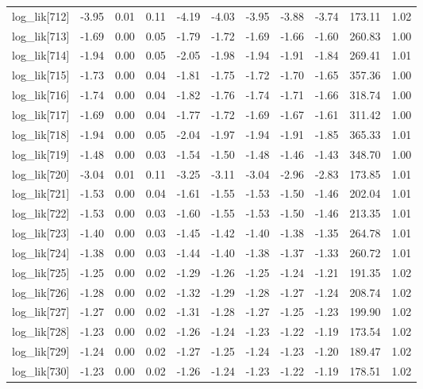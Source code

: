 \begin{table}[ht]
\begin{tabular}{rrrrrrrrrrr}
  log\_lik[712] & -3.95 & 0.01 & 0.11 & -4.19 & -4.03 & -3.95 & -3.88 & -3.74 & 173.11 & 1.02 \\ 
  log\_lik[713] & -1.69 & 0.00 & 0.05 & -1.79 & -1.72 & -1.69 & -1.66 & -1.60 & 260.83 & 1.00 \\ 
  log\_lik[714] & -1.94 & 0.00 & 0.05 & -2.05 & -1.98 & -1.94 & -1.91 & -1.84 & 269.41 & 1.01 \\ 
  log\_lik[715] & -1.73 & 0.00 & 0.04 & -1.81 & -1.75 & -1.72 & -1.70 & -1.65 & 357.36 & 1.00 \\ 
  log\_lik[716] & -1.74 & 0.00 & 0.04 & -1.82 & -1.76 & -1.74 & -1.71 & -1.66 & 318.74 & 1.00 \\ 
  log\_lik[717] & -1.69 & 0.00 & 0.04 & -1.77 & -1.72 & -1.69 & -1.67 & -1.61 & 311.42 & 1.00 \\ 
  log\_lik[718] & -1.94 & 0.00 & 0.05 & -2.04 & -1.97 & -1.94 & -1.91 & -1.85 & 365.33 & 1.01 \\ 
  log\_lik[719] & -1.48 & 0.00 & 0.03 & -1.54 & -1.50 & -1.48 & -1.46 & -1.43 & 348.70 & 1.00 \\ 
  log\_lik[720] & -3.04 & 0.01 & 0.11 & -3.25 & -3.11 & -3.04 & -2.96 & -2.83 & 173.85 & 1.01 \\ 
  log\_lik[721] & -1.53 & 0.00 & 0.04 & -1.61 & -1.55 & -1.53 & -1.50 & -1.46 & 202.04 & 1.01 \\ 
  log\_lik[722] & -1.53 & 0.00 & 0.03 & -1.60 & -1.55 & -1.53 & -1.50 & -1.46 & 213.35 & 1.01 \\ 
  log\_lik[723] & -1.40 & 0.00 & 0.03 & -1.45 & -1.42 & -1.40 & -1.38 & -1.35 & 264.78 & 1.01 \\ 
  log\_lik[724] & -1.38 & 0.00 & 0.03 & -1.44 & -1.40 & -1.38 & -1.37 & -1.33 & 260.72 & 1.01 \\ 
  log\_lik[725] & -1.25 & 0.00 & 0.02 & -1.29 & -1.26 & -1.25 & -1.24 & -1.21 & 191.35 & 1.02 \\ 
  log\_lik[726] & -1.28 & 0.00 & 0.02 & -1.32 & -1.29 & -1.28 & -1.27 & -1.24 & 208.74 & 1.02 \\ 
  log\_lik[727] & -1.27 & 0.00 & 0.02 & -1.31 & -1.28 & -1.27 & -1.25 & -1.23 & 199.90 & 1.02 \\ 
  log\_lik[728] & -1.23 & 0.00 & 0.02 & -1.26 & -1.24 & -1.23 & -1.22 & -1.19 & 173.54 & 1.02 \\ 
  log\_lik[729] & -1.24 & 0.00 & 0.02 & -1.27 & -1.25 & -1.24 & -1.23 & -1.20 & 189.47 & 1.02 \\ 
  log\_lik[730] & -1.23 & 0.00 & 0.02 & -1.26 & -1.24 & -1.23 & -1.22 & -1.19 & 178.51 & 1.02 \\ 

\end{tabular}
\end{table}
